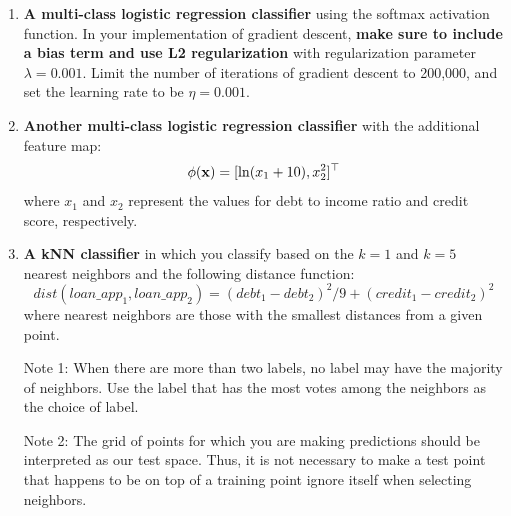 \documentclass[submit]{../harvardml}
\begin{document}
\begin{problem}
\begin{enumerate}[label=\alph*)]
  \item \textbf{A multi-class logistic regression classifier} using the softmax activation function. In your implementation of gradient descent, \textbf{make sure to include a bias term and use L2 regularization} with regularization parameter $\lambda = 0.001$. Limit the number of iterations of gradient descent to 200,000, and set the learning rate to be $\eta = 0.001$.

  \item \textbf{Another multi-class logistic regression classifier} with the additional feature map:
  $$\phi(\mathbf{x}) = [\ln (x_1+10), x_2^2]^\top$$
  where $x_1$ and $x_2$ represent the values for debt to income ratio and credit score, respectively.

  \item \textbf{A kNN classifier} in which you classify based on the $k = 1$ and $k = 5$ nearest neighbors and the following distance function: $$dist(loan\_app_1, loan\_app_2) = (debt_1 - debt_2)^2/9 + (credit_1 - credit_2)^2$$
        where nearest neighbors are those with the smallest distances from a given point.

        Note 1: When there are more than two labels, no label may have the
        majority of neighbors.  Use the label that has the most votes among
        the neighbors as the choice of label.

        Note 2: The grid of points for which you are making predictions
        should be interpreted as our test space.  Thus, it is not necessary
        to make a test point that happens to be on top of a training point
        ignore itself when selecting neighbors.

\end{enumerate}
\end{problem}

\newpage
\end{document}
